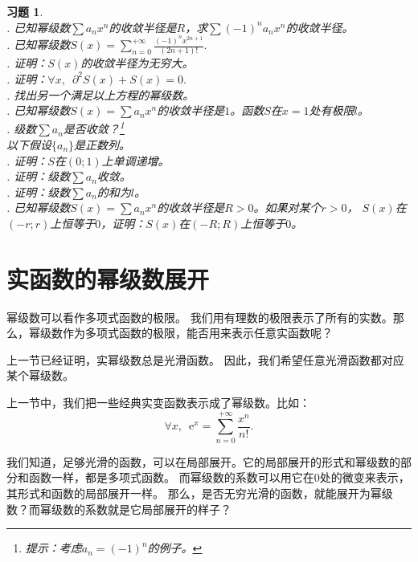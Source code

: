 \documentclass[12pt,UTF8]{ctexbook}
\theoremstyle{definition}
\theoremstyle{plain}
\newtheorem{xt}{习题}[section]
\begin{document}
\begin{xt}    
    \mbox{} \\
    . 已知幂级数$\sum a_n x^n$的收敛半径是$R$，求$\sum (-1)^n a_n x^n$的收敛半径。\\
    . 已知幂级数$S(x) = \sum_{n=0}^{+\infty} \frac{(-1)^n x^{2n+1}}{(2n+1)!}. $\\
    . 证明：$S(x)$的收敛半径为无穷大。\\
    . 证明：$\forall x,\,\,\,\partial^2 S(x) + S(x) = 0.$ \\
    . 找出另一个满足以上方程的幂级数。\\
    . 已知幂级数$S(x) = \sum a_n x^n$的收敛半径是$1$。函数$S$在$x=1$处有极限$l$。\\
    . 级数$\sum a_n$是否收敛？\footnote{提示：考虑$a_n = (-1)^n$的例子。}\\
    \indent 以下假设$\{a_n\}$是正数列。\\
    . 证明：$S$在$(0;1)$上单调递增。\\
    . 证明：级数$\sum a_n$收敛。\\
    . 证明：级数$\sum a_n$的和为$l$。\\
    . 已知幂级数$S(x) = \sum a_n x^n$的收敛半径是$R>0$。如果对某个$r>0$，
    $S(x)$在$(-r;r)$上恒等于$0$，证明：$S(x)$在$(-R;R)$上恒等于$0$。
\end{xt}

\section{实函数的幂级数展开}

幂级数可以看作多项式函数的极限。
我们用有理数的极限表示了所有的实数。那么，幂级数作为多项式函数的极限，能否用来表示任意实函数呢？

上一节已经证明，实幂级数总是光滑函数。
因此，我们希望任意光滑函数都对应某个幂级数。

上一节中，我们把一些经典实变函数表示成了幂级数。比如：
$$ \forall x, \,\,\, \mathrm{e}^x = \sum_{n=0}^{+\infty} \frac{x^n}{n!}. $$

我们知道，足够光滑的函数，可以在局部展开。它的局部展开的形式和幂级数的部分和函数一样，都是多项式函数。
而幂级数的系数可以用它在$0$处的微变来表示，其形式和函数的局部展开一样。
那么，是否无穷光滑的函数，就能展开为幂级数？而幂级数的系数就是它局部展开的样子？
\end{document}
